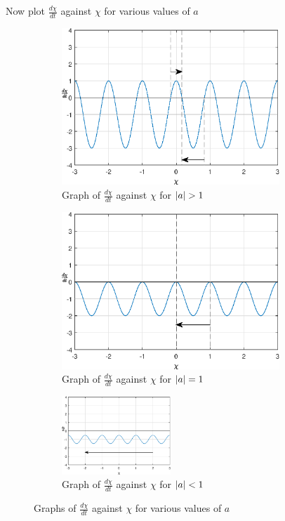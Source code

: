 \documentclass[11pt]{article} %
\let\originalleft\left
\let\originalright\right
\renewcommand{\left}{\mathopen{}\mathclose\bgroup\originalleft}
\renewcommand{\right}{\aftergroup\egroup\originalright}
\begin{document}
Now plot $\frac{d\chi}{dt}$ against $\chi$ for various values of $a$
\begin{figure}[H]
	\begin{subfigure}{0.5\textwidth}
		\centering
		\includegraphics[width=0.9\textwidth]{"../Matlab Files/large a"}
		\caption{Graph of $\frac{d\chi}{dt}$ against $\chi$ for $\left|a\right|>1$}
	\end{subfigure}%
	\begin{subfigure}{.5\textwidth}
		\centering
		\includegraphics[width=0.9\textwidth]{"../Matlab Files/mid a"}
		\caption{Graph of $\frac{d\chi}{dt}$ against $\chi$ for $\left|a\right|=1$}
	\end{subfigure}
	\begin{subfigure}{\textwidth}
		\centering
		\includegraphics[width=0.45\textwidth]{"../Matlab Files/small a"}
		\caption{Graph of $\frac{d\chi}{dt}$ against $\chi$ for $\left|a\right|<1$}
	\end{subfigure}
	\caption{Graphs of $\frac{d\chi}{dt}$ against $\chi$ for various values of $a$}
	\label{fig:grad_vs_X}
\end{figure}
\end{document}

